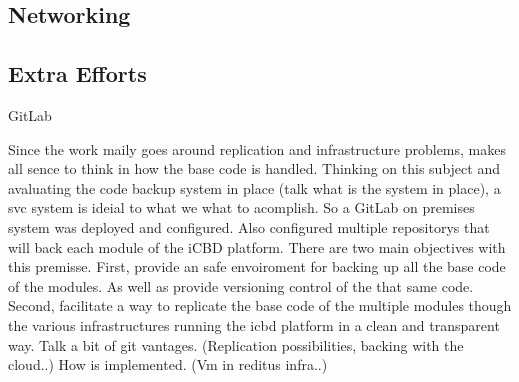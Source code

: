 \subsection{Networking}
\label{sub:cache_networking}

\subsection{Extra Efforts}
\label{sub:extra_efforts}


GitLab

Since the work maily goes around replication and infrastructure problems, makes all sence to think in how the base code is handled. Thinking on this subject and avaluating the code backup system in place (talk what is the system in place), a svc system is ideial to what we what to acomplish.
So a GitLab on premises system was deployed and configured. Also configured multiple repositorys that will back each module of the iCBD platform.
There are two main objectives with this premisse.
First, provide an safe envoiroment for backing up all the base code of the modules. As well as provide versioning control of the that same code.
Second, facilitate a way to replicate the base code of the multiple modules though the various infrastructures running the icbd platform in a clean and transparent way.
Talk a bit of git vantages. (Replication possibilities, backing with the cloud..)
How is implemented. (Vm in reditus infra..)



